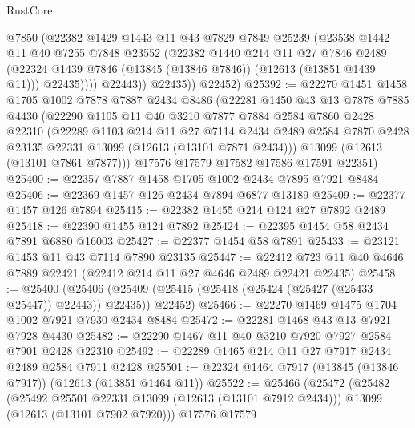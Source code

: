 \begin{lexlean}{RustCore}
\begin{coremodule}
                @7850
                (@22382
                  @1429
                  @1443
                  @11
                  @43
                  @7829
                  @7849
                  @25239
                  (@23538
                    @1442
                    @11
                    @40
                    @7255
                    @7848
                    @23552
                    (@22382
                      @1440
                      @214
                      @11
                      @27
                      @7846
                      @2489
                      (@22324 @1439 @7846 (@13845 (@13846 @7846)) (@12613 (@13851 @1439 @11)))
                      @22435))))
              @22443))
          @22435))
      @22452)
@25392 := @22270
    @1451
    @1458
    @1705
    @1002
    @7878
    @7887
    @2434
    @8486
    (@22281
      @1450
      @43
      @13
      @7878
      @7885
      @4430
      (@22290
        @1105
        @11
        @40
        @3210
        @7877
        @7884
        @2584
        @7860
        @2428
        @22310
        (@22289
          @1103
          @214
          @11
          @27
          @7114
          @2434
          @2489
          @2584
          @7870
          @2428
          @23135
          @22331
          @13099
          (@12613 (@13101 @7871 @2434)))
        @13099
        (@12613 (@13101 @7861 @7877)))
      @17576
      @17579
      @17582
      @17586
      @17591
      @22351)
@25400 := @22357 @7887 @1458 @1705 @1002 @2434 @7895 @7921 @8484
@25406 := @22369 @1457 @126 @2434 @7894 @6877 @13189
@25409 := @22377 @1457 @126 @7894
@25415 := @22382 @1455 @214 @124 @27 @7892 @2489
@25418 := @22390 @1455 @124 @7892
@25424 := @22395 @1454 @58 @2434 @7891 @6880 @16003
@25427 := @22377 @1454 @58 @7891
@25433 := @23121 @1453 @11 @43 @7114 @7890 @23135
@25447 := @22412 @723 @11 @40 @4646 @7889 @22421 (@22412 @214 @11 @27 @4646 @2489 @22421 @22435)
@25458 := @25400
    (@25406 (@25409 (@25415 (@25418 (@25424 (@25427 (@25433 @25447)) @22443)) @22435)) @22452)
@25466 := @22270 @1469 @1475 @1704 @1002 @7921 @7930 @2434 @8484
@25472 := @22281 @1468 @43 @13 @7921 @7928 @4430
@25482 := @22290 @1467 @11 @40 @3210 @7920 @7927 @2584 @7901 @2428 @22310
@25492 := @22289 @1465 @214 @11 @27 @7917 @2434 @2489 @2584 @7911 @2428
@25501 := @22324 @1464 @7917 (@13845 (@13846 @7917)) (@12613 (@13851 @1464 @11))
@25522 := @25466
    (@25472
      (@25482
        (@25492 @25501 @22331 @13099 (@12613 (@13101 @7912 @2434)))
        @13099
        (@12613 (@13101 @7902 @7920)))
      @17576
      @17579

\end{coremodule}
\end{lexlean}
